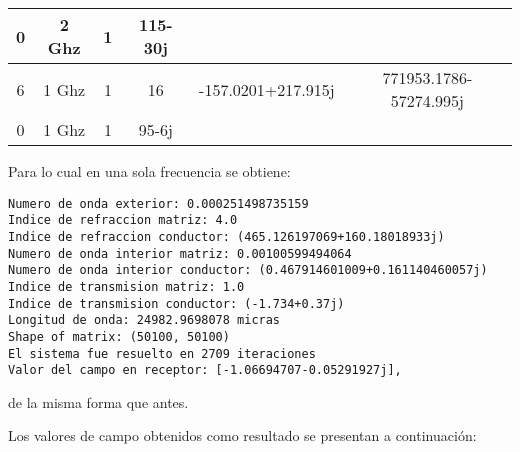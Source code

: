 \documentclass[12pt,letterpaper]{report}
\numberwithin{equation}{section}
\begin{document}
\begin{table}[H]
\begin{tabular}{@{}|c|c|c|c|c|c|@{}}
		0              & 2 Ghz                   & 1                 & 115-30j            &                    &                         \\ \midrule
		6              & 1 Ghz                   & 1                 & 16                 & -157.0201+217.915j & 771953.1786-57274.995j  \\ \midrule
		0              & 1 Ghz                   & 1                 & 95-6j              &                    &                         \\ \bottomrule
	\end{tabular}
\end{table}






Para lo cual en una sola frecuencia se obtiene:

\begin{lstlisting}
Numero de onda exterior: 0.000251498735159
Indice de refraccion matriz: 4.0
Indice de refraccion conductor: (465.126197069+160.18018933j)
Numero de onda interior matriz: 0.00100599494064
Numero de onda interior conductor: (0.467914601009+0.161140460057j)
Indice de transmision matriz: 1.0
Indice de transmision conductor: (-1.734+0.37j)
Longitud de onda: 24982.9698078 micras
Shape of matrix: (50100, 50100)
El sistema fue resuelto en 2709 iteraciones
Valor del campo en receptor: [-1.06694707-0.05291927j],
\end{lstlisting}
\noindent de la misma forma que antes.

Los valores de campo obtenidos como resultado se presentan a continuación:
\end{document}
